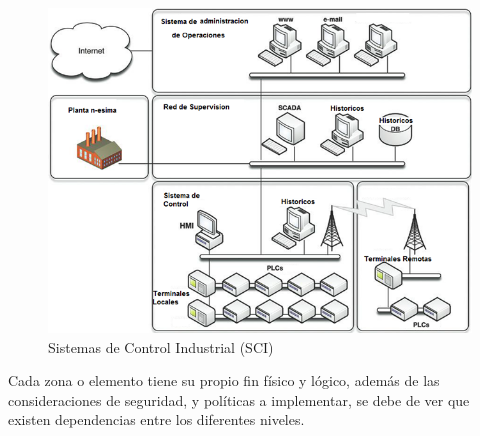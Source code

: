 \documentclass[jou,apacite]{apa6}   %
\begin{document}
\begin{figure}[htb]
\centering
\includegraphics[scale=0.5]{images/sci.png}
\caption{Sistemas de Control Industrial (SCI)} \label{fig:sci}
\end{figure}

Cada zona o elemento tiene su propio fin físico y lógico, además de las consideraciones de seguridad, y políticas a implementar, se debe de ver que  existen dependencias entre los diferentes niveles. 
\end{document}
